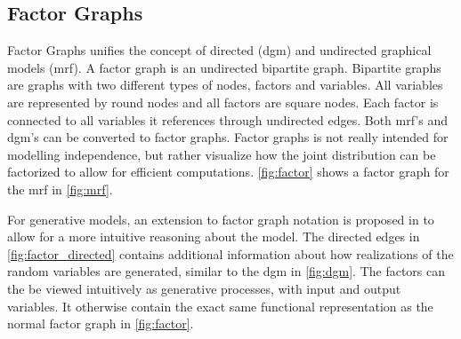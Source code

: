 \subsection{Factor Graphs}
Factor Graphs unifies the concept of directed (\acrshort{dgm}) and undirected graphical models (\acrshort{mrf}). A factor graph is an undirected bipartite graph. Bipartite graphs are graphs with two different types of nodes, factors and variables. All variables are represented by round nodes and all factors are square nodes. Each factor is connected to all variables it references through undirected edges. Both \acrshort{mrf}'s and \acrshort{dgm}'s can be converted to factor graphs. Factor graphs is not really intended for modelling independence, but rather visualize how the joint distribution can be factorized to allow for efficient computations. \cref{fig:factor} shows a factor graph for the \acrshort{mrf} in \cref{fig:mrf}.

For generative models, an extension to factor graph notation is proposed in \cite{dietz} to allow for a more intuitive reasoning about the model. The directed edges in \cref{fig:factor_directed} contains additional information about how realizations of the random variables are generated, similar to the \acrshort{dgm} in \cref{fig:dgm}. The factors can the be viewed intuitively as generative processes, with input and output variables. It otherwise contain the exact same functional representation as the normal factor graph in \cref{fig:factor}. 

